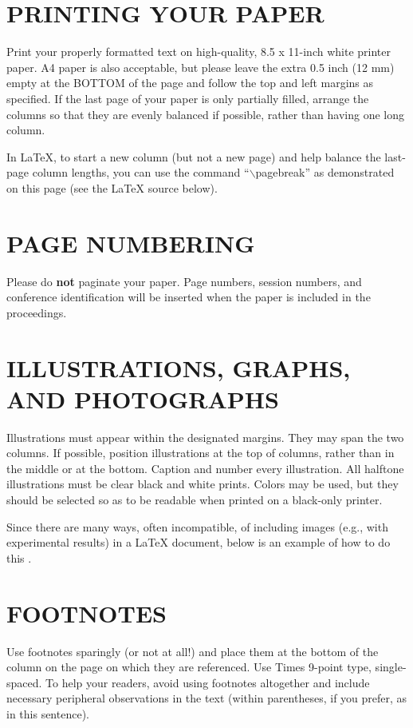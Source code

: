 \documentclass{article}
\begin{document}
\section{PRINTING YOUR PAPER}
\label{sec:print}

Print your properly formatted text on high-quality, 8.5 x 11-inch white printer
paper. A4 paper is also acceptable, but please leave the extra 0.5 inch (12 mm)
empty at the BOTTOM of the page and follow the top and left margins as
specified.  If the last page of your paper is only partially filled, arrange
the columns so that they are evenly balanced if possible, rather than having
one long column.

In LaTeX, to start a new column (but not a new page) and help balance the
last-page column lengths, you can use the command ``$\backslash$pagebreak'' as
demonstrated on this page (see the LaTeX source below).

\section{PAGE NUMBERING}
\label{sec:page}

Please do {\bf not} paginate your paper.  Page numbers, session numbers, and
conference identification will be inserted when the paper is included in the
proceedings.

\section{ILLUSTRATIONS, GRAPHS, AND PHOTOGRAPHS}
\label{sec:illust}

Illustrations must appear within the designated margins.  They may span the two
columns.  If possible, position illustrations at the top of columns, rather
than in the middle or at the bottom.  Caption and number every illustration.
All halftone illustrations must be clear black and white prints.  Colors may be
used, but they should be selected so as to be readable when printed on a
black-only printer.

Since there are many ways, often incompatible, of including images (e.g., with
experimental results) in a LaTeX document, below is an example of how to do
this \cite{C2}.

\section{FOOTNOTES}
\label{sec:foot}

Use footnotes sparingly (or not at all!) and place them at the bottom of the
column on the page on which they are referenced. Use Times 9-point type,
single-spaced. To help your readers, avoid using footnotes altogether and
include necessary peripheral observations in the text (within parentheses, if
you prefer, as in this sentence).
\end{document}
